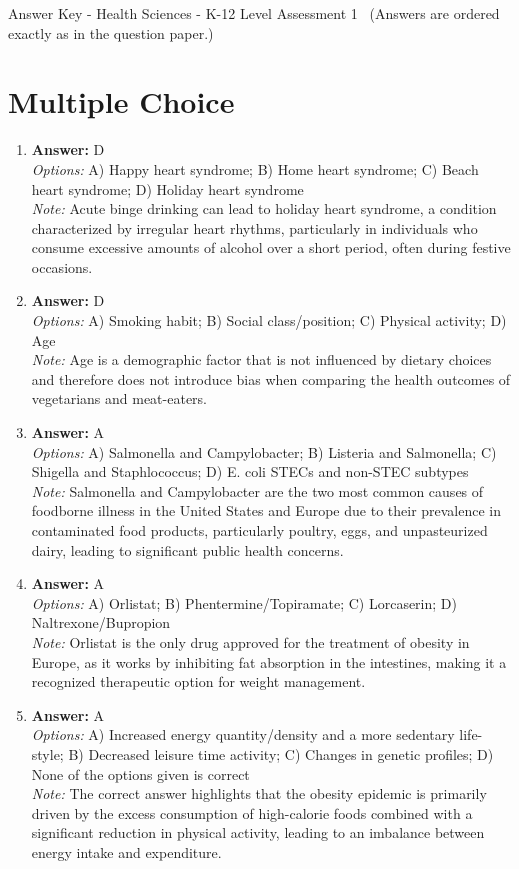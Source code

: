 \documentclass[12pt]{article}
\begin{document}
\begin{center}
Answer Key - Health Sciences - K-12 Level Assessment 1 \
\small (Answers are ordered exactly as in the question paper.)
\end{center}

\section*{Multiple Choice}
\begin{enumerate}[label=\arabic*.]
\item \textbf{Answer:} D
\\ \textit{Options:} A) Happy heart syndrome; B) Home heart syndrome; C) Beach heart syndrome; D) Holiday heart syndrome
\\ \textit{Note:} Acute binge drinking can lead to holiday heart syndrome, a condition characterized by irregular heart rhythms, particularly in individuals who consume excessive amounts of alcohol over a short period, often during festive occasions.
\item \textbf{Answer:} D
\\ \textit{Options:} A) Smoking habit; B) Social class/position; C) Physical activity; D) Age
\\ \textit{Note:} Age is a demographic factor that is not influenced by dietary choices and therefore does not introduce bias when comparing the health outcomes of vegetarians and meat-eaters.
\item \textbf{Answer:} A
\\ \textit{Options:} A) Salmonella and Campylobacter; B) Listeria and Salmonella; C) Shigella and Staphlococcus; D) E. coli STECs and non-STEC subtypes
\\ \textit{Note:} Salmonella and Campylobacter are the two most common causes of foodborne illness in the United States and Europe due to their prevalence in contaminated food products, particularly poultry, eggs, and unpasteurized dairy, leading to significant public health concerns.
\item \textbf{Answer:} A
\\ \textit{Options:} A) Orlistat; B) Phentermine/Topiramate; C) Lorcaserin; D) Naltrexone/Bupropion
\\ \textit{Note:} Orlistat is the only drug approved for the treatment of obesity in Europe, as it works by inhibiting fat absorption in the intestines, making it a recognized therapeutic option for weight management.
\item \textbf{Answer:} A
\\ \textit{Options:} A) Increased energy quantity/density and a more sedentary life-style; B) Decreased leisure time activity; C) Changes in genetic profiles; D) None of the options given is correct
\\ \textit{Note:} The correct answer highlights that the obesity epidemic is primarily driven by the excess consumption of high-calorie foods combined with a significant reduction in physical activity, leading to an imbalance between energy intake and expenditure.
\end{enumerate}
\end{document}
